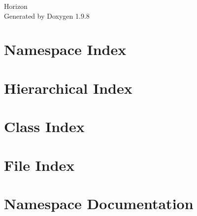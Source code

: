 \documentclass[twoside]{book}
\newcommand{\+}{\discretionary{\mbox{\scriptsize$\hookleftarrow$}}{}{}}
\newcommand{\clearemptydoublepage}{%
    \newpage{\pagestyle{empty}\cleardoublepage}%
  }
\begin{document}
  \raggedbottom
    \hypersetup{pageanchor=false,
                bookmarksnumbered=true,
                pdfencoding=unicode
               }
  \begin{titlepage}
  \vspace*{7cm}
  \begin{center}%
  {\Large Horizon}\\
  \vspace*{1cm}
  {\large Generated by Doxygen 1.9.8}\\
  \end{center}
  \end{titlepage}
  \clearemptydoublepage
  \tableofcontents
  \clearemptydoublepage
  \hypersetup{pageanchor=true}
\chapter{Namespace Index}

\chapter{Hierarchical Index}

\chapter{Class Index}

\chapter{File Index}

\chapter{Namespace Documentation}
























\end{document}
